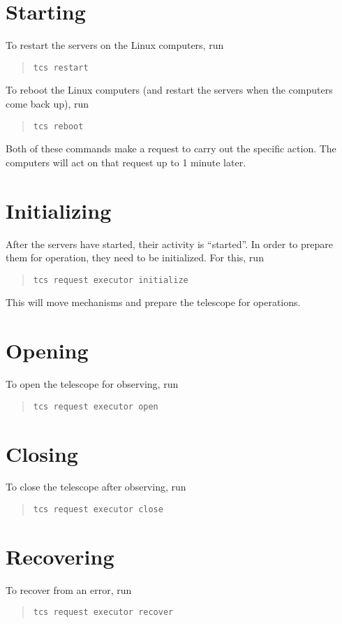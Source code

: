 \section{Starting}

To restart the servers on the Linux computers, run
\begin{quote}
\verb|tcs restart|
\end{quote}

To reboot the Linux computers (and restart the servers when the computers come back up), run
\begin{quote}
\verb|tcs reboot|
\end{quote}

Both of these commands make a request to carry out the specific action. The computers will act on that request up to 1 minute later.

\section{Initializing}

After the servers have started, their activity is “started”. In order to prepare them for operation, they need to be initialized. For this, run
\begin{quote}
\verb|tcs request executor initialize|
\end{quote}
This will move mechanisms and prepare the telescope for operations.

\section{Opening}

To open the telescope for observing, run
\begin{quote}
\verb|tcs request executor open|
\end{quote}

\section{Closing}

To close the telescope after observing, run
\begin{quote}
\verb|tcs request executor close|
\end{quote}

\section{Recovering}

To recover from an error, run
\begin{quote}
\verb|tcs request executor recover|
\end{quote}

